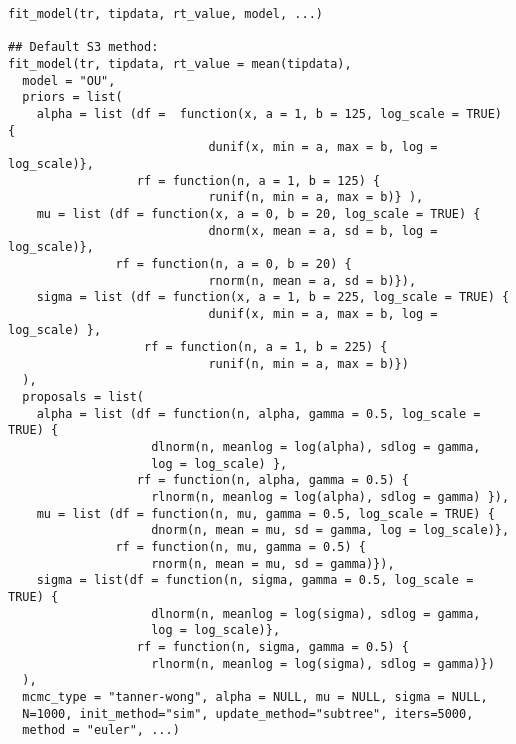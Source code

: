 \documentclass[letterpaper]{book}
\begin{document}
%
\begin{Usage}
\begin{verbatim}
fit_model(tr, tipdata, rt_value, model, ...)

## Default S3 method:
fit_model(tr, tipdata, rt_value = mean(tipdata),
  model = "OU",
  priors = list(
    alpha = list (df =  function(x, a = 1, b = 125, log_scale = TRUE) {
                            dunif(x, min = a, max = b, log = log_scale)},
                  rf = function(n, a = 1, b = 125) {
                            runif(n, min = a, max = b)} ),
    mu = list (df = function(x, a = 0, b = 20, log_scale = TRUE) {
                            dnorm(x, mean = a, sd = b, log = log_scale)},
               rf = function(n, a = 0, b = 20) {
                            rnorm(n, mean = a, sd = b)}),
    sigma = list (df = function(x, a = 1, b = 225, log_scale = TRUE) {
                            dunif(x, min = a, max = b, log = log_scale) },
                   rf = function(n, a = 1, b = 225) {
                            runif(n, min = a, max = b)})
  ),
  proposals = list(
    alpha = list (df = function(n, alpha, gamma = 0.5, log_scale = TRUE) {
                    dlnorm(n, meanlog = log(alpha), sdlog = gamma,
                    log = log_scale) },
                  rf = function(n, alpha, gamma = 0.5) {
                    rlnorm(n, meanlog = log(alpha), sdlog = gamma) }),
    mu = list (df = function(n, mu, gamma = 0.5, log_scale = TRUE) {
                    dnorm(n, mean = mu, sd = gamma, log = log_scale)},
               rf = function(n, mu, gamma = 0.5) {
                    rnorm(n, mean = mu, sd = gamma)}),
    sigma = list(df = function(n, sigma, gamma = 0.5, log_scale = TRUE) {
                    dlnorm(n, meanlog = log(sigma), sdlog = gamma,
                    log = log_scale)},
                  rf = function(n, sigma, gamma = 0.5) {
                    rlnorm(n, meanlog = log(sigma), sdlog = gamma)})
  ),
  mcmc_type = "tanner-wong", alpha = NULL, mu = NULL, sigma = NULL,
  N=1000, init_method="sim", update_method="subtree", iters=5000,
  method = "euler", ...)
\end{verbatim}
\end{Usage}
%
\end{document}

